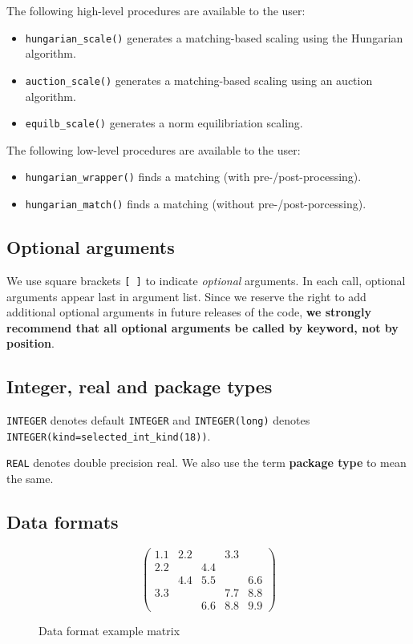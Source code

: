 \medskip

\noindent
The following high-level procedures are available to the user:
\begin{itemize}
\item {\tt hungarian\_scale()} generates a matching-based scaling using the Hungarian algorithm.
\item {\tt auction\_scale()} generates a matching-based scaling using an auction algorithm.
\item {\tt equilb\_scale()} generates a norm equilibriation scaling.
\end{itemize}
The following low-level procedures are available to the user:
\begin{itemize}
   \item {\tt hungarian\_wrapper()} finds a matching (with pre-/post-processing).
   \item {\tt hungarian\_match()} finds a matching (without pre-/post-porcessing).
\end{itemize}

\subsection{Optional arguments}\label{Optional arguments}

We use square brackets {\tt [ ]} to indicate {\it optional} arguments.
In each
call, optional arguments appear last in argument list.  Since we
reserve the right to add additional optional arguments in future
releases of the code, {\bf we strongly recommend that all optional
arguments be called by keyword, not by position}.

\subsection{Integer, real and package types}\label{Integer kinds}

{\tt INTEGER} denotes default {\tt INTEGER} and
{\tt INTEGER(long)} denotes {\tt INTEGER(kind=selected\_int\_kind(18))}.

\noindent
{\tt REAL} denotes double precision real.
We also use the term {\bf package type} to mean the same.

\subsection{Data formats} \label{dataformats}

\begin{figure}
   \caption{ \label{format eg}
      Data format example matrix
   }
   $$
      \left( \begin{array}{ccccc}
         1.1 & 2.2 &     & 3.3 &     \\
         2.2 &     & 4.4 &     &     \\
             & 4.4 & 5.5 &     & 6.6 \\
         3.3 &     &     & 7.7 & 8.8 \\
             &     & 6.6 & 8.8 & 9.9
      \end{array} \right)
   $$
\end{figure}

